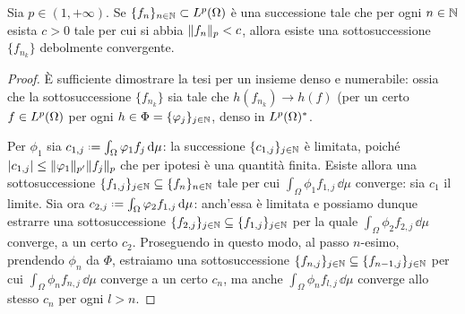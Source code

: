 \begin{teorema} \label{t:banach-alaoglu}
    Sia $p\in(1,+\infty)$.
    Se $\{f_n\}_{n\in\N}\subset\leb[p]{\Omega}$ è una successione tale che per ogni $n\in\N$ esista $c>0$ tale per cui si abbia $\norm{f_n}_p<c$, allora esiste una sottosuccessione $\{f_{n_k}\}$ debolmente convergente.
\end{teorema}
\begin{proof}
    È sufficiente dimostrare la tesi per un insieme denso e numerabile: ossia che la sottosuccessione $\{f_{n_k}\}$ sia tale che $h(f_{n_k})\to h(f)$ (per un certo $f\in\leb[p]{\Omega}$ per ogni $h\in\Phi=\{\phi_j\}_{j\in\N}$, denso in $\dual{\leb[p]{\Omega}}$.

    Per $\phi_1$ sia $c_{1,j}\defeq\int_\Omega \phi_1f_j\,\dd\mu$: la successione $\{c_{1,j}\}_{j\in\N}$ è limitata, poich\'e $\abs{c_{1,j}}\le\norm{\phi_1}_{p'}\norm{f_j}_p$ che per ipotesi è una quantità finita.
    Esiste allora una sottosuccessione $\{f_{1,j}\}_{j\in\N}\subseteq\{f_n\}_{n\in\N}$ tale per cui $\int_\Omega \phi_1f_{1,j}\,\dd\mu$ converge: sia $c_1$ il limite.
    Sia ora $c_{2,j}\defeq\int_\Omega \phi_2f_{1,j}\,\dd\mu$: anch'essa è limitata e possiamo dunque estrarre una sottosuccessione $\{f_{2,j}\}_{j\in\N}\subseteq\{f_{1,j}\}_{j\in\N}$ per la quale $\int_\Omega \phi_2f_{2,j}\,\dd\mu$ converge, a un certo $c_2$.
    Proseguendo in questo modo, al passo $n$-esimo, prendendo $\phi_n$ da $\Phi$, estraiamo una sottosuccessione $\{f_{n,j}\}_{j\in\N}\subseteq\{f_{n-1,j}\}_{j\in\N}$ per cui $\int_\Omega \phi_nf_{n,j}\,\dd\mu$ converge a un certo $c_n$, ma anche $\int_\Omega \phi_nf_{l,j}\,\dd\mu$ converge allo stesso $c_n$ per ogni $l>n$.


\end{proof}
